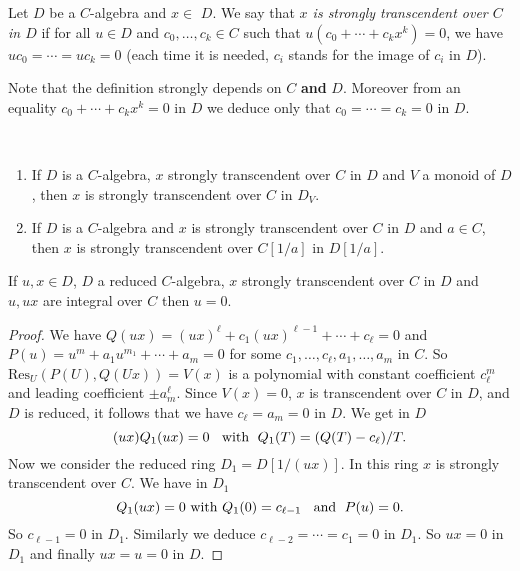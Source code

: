 \documentclass[11pt,a4paper,twoside]{article}
\begin{document}
Let $ D$ be a $C$-algebra and $x\in$ $D$. We say that \emph{$x$ is strongly transcendent over $C$ in $D$} if for all
$u\in D$ and $c_0,\dots,c_k\in C$ such that $u(c_0+ \cdots+c_kx^k) = 0$, we have
$uc_0 = \cdots = uc_k = 0$ (each time it is needed,  $c_i$ stands for  the image of $c_i$ in $D$).

Note that the definition strongly depends on $C$ {\bf and} $D$.
Moreover from an equality $c_0+ \cdots+c_kx^k = 0$ in $D$ we deduce only that
$c_0 = \cdots = c_k = 0$ in $D$.

\begin{lemma}\label{trans1}~
%
\begin{enumerate}
%
\item If  $D$ is a  $C$-algebra, $x$  strongly transcendent over $C$ in $D$ and
$V$  a monoid of $D$, then $x$ is strongly transcendent over $C$ in $D_V$.
%
\item If  $D$ is a  $C$-algebra and $x$ is strongly transcendent over $C$
in $D$ and $a\in C$,
then $x$ is strongly transcendent over $C[1/a]$ in $D[1/a]$.
%
\end{enumerate}
\end{lemma}

\begin{lemma}\label{integral}
If $u,x\in D$, $D$ a reduced $C$-algebra, $x$ strongly transcendent over $C$
 in $D$ and $u,ux$ are integral over $C$ then $u=0$.
\end{lemma}

\begin{proof}
We have $Q(ux)=(ux)^\ell + c_1 (ux)^{\ell-1} + \cdots + c_\ell = 0$ and $P(u)=u^m+a_1u^{m_1}+ \cdots + a_m = 0$ for some $c_1,\dots, c_\ell,a_1,\dots,a_m$ in $C$.
So $\mathrm{Res}_U(P(U),Q(Ux))=V(x)$ is a polynomial with constant coefficient $c_\ell^m$ and leading coefficient $\pm a_m^{\ell}$. Since $V(x)=0$, $x$ is transcendent over $C$ in $D$, and $D$ is reduced,
it follows that we have $c_\ell = a_m= 0$ in $D$. 
We get in $D$
$$(ux)Q_1(ux)=0 \;\;\hbox{ with  }\; Q_1(T)=(Q(T)-c_\ell)/T.
$$
Now we consider the reduced ring $ D_1=D[1/(ux)]$. In this ring $x$ is strongly transcendent over $C$.
We have in $D_1$  
$$Q_1(ux)=0 \hbox{ with  } Q_1(0)=c_{\ell-1} \;\; \hbox{ and }\;P(u)=0.$$
So $c_{\ell-1}=0$ in $D_1$. 
Similarly we deduce $c_{\ell-2}=\cdots=c_1=0$ in $D_1$.
So $ux=0$ in $D_1$ and finally $ux=u=0$ in $D$.
\end{proof}
\end{document}
